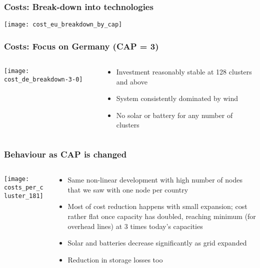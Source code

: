 \documentclass[10pt,aspectratio=169,dvipsnames]{beamer}
\let\olditem\item
\renewcommand{\item}{%
\olditem\vspace{5pt}}
\begin{document}
\begin{frame}
  \frametitle{Costs: Break-down into technologies}

\centering

  \texttt{[image: cost\_eu\_breakdown\_by\_cap]}
\end{frame}



\begin{frame}
  \frametitle{Costs: Focus on Germany (CAP = 3)}

\begin{columns}[T]
\begin{column}{8.5cm}
\centering
  \texttt{[image: cost\_de\_breakdown-3-0]}
\end{column}
\begin{column}{6cm}
  \begin{itemize}
  \item Investment reasonably stable at 128 clusters and above
  \item System consistently dominated by wind
  \item No solar or battery for any number of clusters
  \end{itemize}
\end{column}
\end{columns}


\end{frame}




\begin{frame}
  \frametitle{Behaviour as CAP is changed}


\begin{columns}[T]
\begin{column}{8.5cm}
\centering
  \texttt{[image: costs\_per\_cluster\_181]}
\end{column}
\begin{column}{6cm}
  \begin{itemize}
    \item Same non-linear development with high number of nodes that we saw with one node per country
      \item Most of cost reduction happens with small expansion; cost
        rather flat once capacity has doubled, reaching minimum (for
        overhead lines) at 3 times today's capacities
      \item Solar and batteries decrease significantly as grid expanded
  \item  Reduction in storage losses too
  \end{itemize}
\end{column}
\end{columns}
\end{frame}
\end{document}
